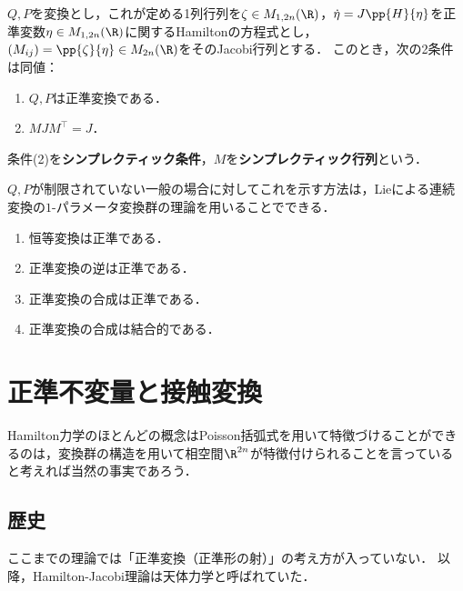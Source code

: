 \documentclass[uplatex,dvipdfmx]{jsreport}
\begin{document}
\begin{theorem}[symplecticな定式化]
    $Q,P$を変換とし，これが定める1列行列を$\zeta\in M_{1,2n}(\R)$，$\dot{\eta}=J\pp{H}{\eta}$を正準変数$\eta\in M_{1,2n}(\R)$に関するHamiltonの方程式とし，$(M_{ij})=\pp{\zeta}{\eta}\in M_{2n}(\R)$をそのJacobi行列とする．
    このとき，次の2条件は同値：
    \begin{enumerate}
        \item $Q,P$は正準変換である．
        \item $MJM^\top=J$．
    \end{enumerate}
    条件(2)を\textbf{シンプレクティック条件}，$M$を\textbf{シンプレクティック行列}という．
\end{theorem}
\begin{history}
    $Q,P$が制限されていない一般の場合に対してこれを示す方法は，Lieによる連続変換の$1$-パラメータ変換群の理論を用いることでできる．
\end{history}

\begin{proposition}[正準変換の群]\mbox{}
    \begin{enumerate}
        \item 恒等変換は正準である．
        \item 正準変換の逆は正準である．
        \item 正準変換の合成は正準である．
        \item 正準変換の合成は結合的である．
    \end{enumerate}
\end{proposition}

\section{正準不変量と接触変換}

\begin{tcolorbox}[colframe=ForestGreen, colback=ForestGreen!10!white,breakable,colbacktitle=ForestGreen!40!white,coltitle=black,fonttitle=\bfseries\sffamily,
title=]
    Hamilton力学のほとんどの概念はPoisson括弧式を用いて特徴づけることができるのは，変換群の構造を用いて相空間$\R^{2n}$が特徴付けられることを言っていると考えれば当然の事実であろう．
\end{tcolorbox}

\subsection{歴史}

\begin{tcolorbox}[colframe=ForestGreen, colback=ForestGreen!10!white,breakable,colbacktitle=ForestGreen!40!white,coltitle=black,fonttitle=\bfseries\sffamily,
    title=]
    ここまでの理論では「正準変換（正準形の射）」の考え方が入っていない．
    以降，Hamilton-Jacobi理論は天体力学と呼ばれていた．
\end{tcolorbox}
\end{document}
